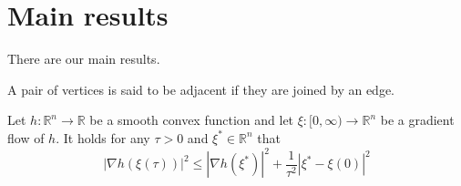 %

\chapter{Main results}

There are our main results.

\begin{definition}\label{Adjacent-vertices}
   \leanok
  A pair of vertices is said to be adjacent if they are joined by an edge.
\end{definition}

\begin{lemma}\label{Luo--lemma}
   \leanok
  Let $ h: \mathbb{R}^{n} \rightarrow \mathbb{R} $ be a smooth convex function and let $ \xi:[0, \infty) \rightarrow \mathbb{R}^{n} $ be a gradient flow of $ h $. It holds for any $ \tau>0 $ and $ \xi^{*} \in \mathbb{R}^{n} $ that
  $$
  |\nabla h(\xi(\tau))|^{2} \leq\left|\nabla h\left(\xi^{*}\right)\right|^{2}+\frac{1}{\tau^{2}}\left|\xi^{*}-\xi(0)\right|^{2}
  $$

\end{lemma}

